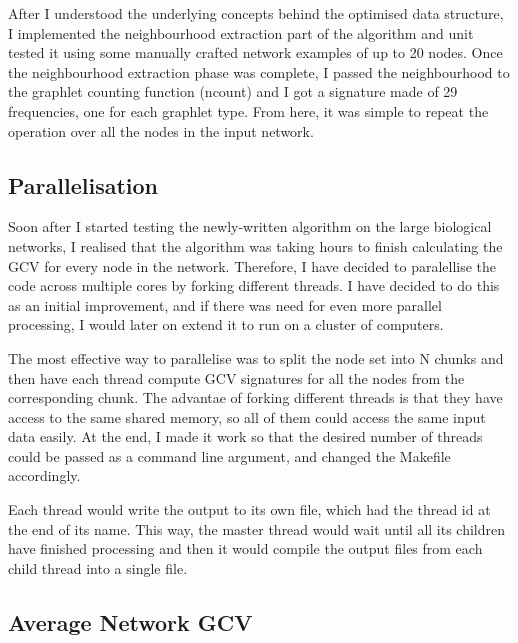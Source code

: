 After I understood the underlying concepts behind the optimised data structure, I
implemented the neighbourhood extraction part of the algorithm and unit tested
it using some manually crafted network examples of up to 20 nodes. Once the
neighbourhood extraction phase was complete, I passed the neighbourhood to the
graphlet counting function (ncount) and I got a signature made of 29
frequencies, one for each graphlet type. From here, it was simple to repeat the
operation over all the nodes in the input network.

\subsection{Parallelisation}

Soon after I started testing the newly-written algorithm on the large
biological networks, I realised that the algorithm was taking hours to finish
calculating the GCV for every node in the network. Therefore, I have decided to
paralellise the code across multiple cores by forking different threads. I have
decided to do this as an initial improvement, and if there was need for even
more parallel processing, I would later on extend it to run on a cluster of
computers.


The most effective way to parallelise was to split the node set into N chunks
and then have each thread compute GCV signatures for all the nodes from the
corresponding chunk. The advantae of forking different threads is that they
have access to the same shared memory, so all of them could access the same
input data easily. At the end, I made it work so that the desired number of
threads could be passed as a command line argument, and changed the Makefile
accordingly.

Each thread would write the output to its own file, which had the thread id at
the end of its name. This way, the master thread would wait until all its
children have finished processing and then it would compile the output files
from each child thread into a single file. 




\subsection{Average Network GCV}

